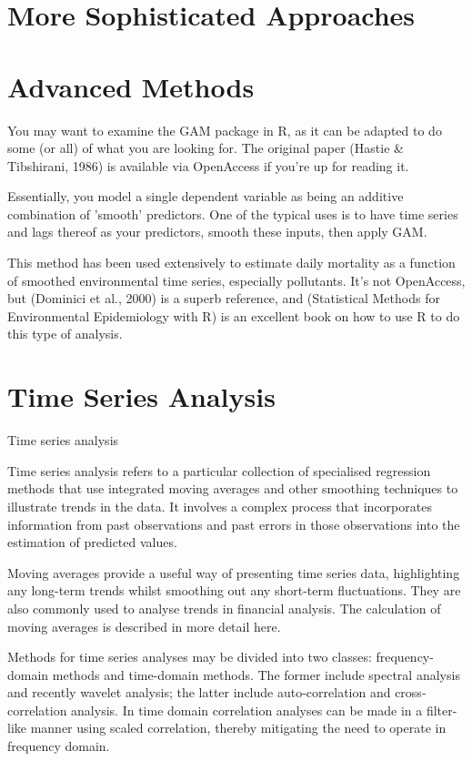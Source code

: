 \documentclass{article}\usepackage[]{graphicx}\usepackage[]{color}
\begin{document}
\section{More Sophisticated Approaches}

\section{Advanced Methods}

You may want to examine the GAM package in R, as it can be adapted to do some (or all) of what you are looking for. The original paper (Hastie \& Tibshirani, 1986) is available via OpenAccess if you're up for reading it.

Essentially, you model a single dependent variable as being an additive combination of 'smooth' predictors. One of the typical uses is to have time series and lags thereof as your predictors, smooth these inputs, then apply GAM.

This method has been used extensively to estimate daily mortality as a function of smoothed environmental time series, especially pollutants. It's not OpenAccess, but (Dominici et al., 2000) is a superb reference, and (Statistical Methods for Environmental Epidemiology with R) is an excellent book on how to use R to do this type of analysis.

\section{Time Series Analysis}

Time series analysis

Time series analysis refers to a particular collection of specialised regression methods that use integrated moving averages and other smoothing techniques to illustrate trends in the data. It involves a complex process that incorporates information from past observations and past errors in those observations into the estimation of predicted values.

Moving averages provide a useful way of presenting time series data, highlighting any long-term trends whilst smoothing out any short-term fluctuations. They are also commonly used to analyse trends in financial analysis. The calculation of moving averages is described in more detail here.

Methods for time series analyses may be divided into two classes: frequency-domain methods and time-domain methods. The former include spectral analysis and recently wavelet analysis; the latter include auto-correlation and cross-correlation analysis. In time domain correlation analyses can be made in a filter-like manner using scaled correlation, thereby mitigating the need to operate in frequency domain.
\end{document}
